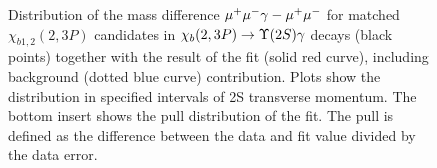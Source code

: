 \begin{figure}[H]
{\begin{picture}





  \end{picture}
  }
  \caption {\small 
    Distribution of the mass difference $\mumu \gamma - \mumu$ for matched
    $\chi_{b1,2}(2,3P)$ candidates in $\chi_b(2,3P) \to \Y2S \gamma$ decays
    (black points) together with the result of the fit (solid red curve),
    including background (dotted blue curve) contribution. Plots show the
    distribution in specified intervals of \Y2S transverse momentum. The bottom
    insert shows the  pull distribution of the fit. The pull is defined as the
    difference  between the data and fit value divided by the data error. }
  \label{fig:mc:ups2s:fits}
\end{figure}

